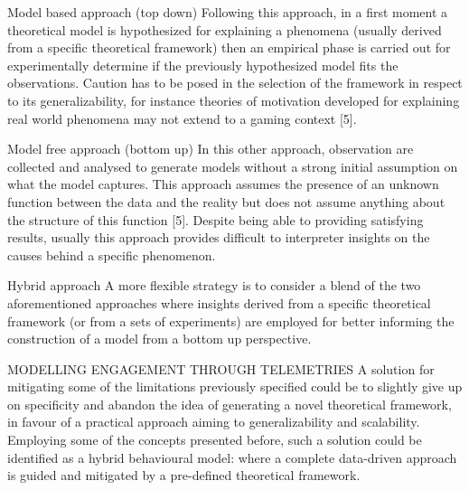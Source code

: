 Model based approach (top down)		
Following this approach, in a first moment a theoretical model is hypothesized for explaining a phenomena (usually derived from a specific theoretical framework) then an empirical phase is carried out for experimentally determine if the previously hypothesized model fits the observations. Caution has to be posed in the selection of the framework in respect to its generalizability, for instance theories of motivation developed for explaining real world phenomena may not extend to a gaming context [5].

Model free approach (bottom up)		
In this other approach, observation are collected and analysed to generate models without a strong initial assumption on what the model captures. This approach assumes the presence of an unknown function between the data and the reality but does not assume anything about the structure of this function [5]. Despite being able to providing satisfying results, usually this approach provides difficult to interpreter insights on the causes behind a specific phenomenon.

Hybrid approach		
A more flexible strategy is to consider a blend of the two aforementioned approaches where insights derived from a specific theoretical framework (or from a sets of experiments) are employed for better informing the construction of a model from a bottom up perspective.

MODELLING ENGAGEMENT THROUGH TELEMETRIES
A solution for mitigating some of the limitations previously specified could be to slightly give up on specificity and abandon the idea of generating a novel theoretical framework, in favour of a practical approach aiming to generalizability and scalability. Employing some of the concepts presented before, such a solution could be identified as a hybrid behavioural model: where a complete data-driven approach is guided and mitigated by a pre-defined theoretical framework.

